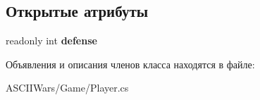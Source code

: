 \subsection*{Открытые атрибуты}
\begin{DoxyCompactItemize}
\item 
\hypertarget{class_a_s_c_i_i_wars_1_1_game_1_1_armor_ac056d4feeb6864656f00144af7a4ed8b}{}\label{class_a_s_c_i_i_wars_1_1_game_1_1_armor_ac056d4feeb6864656f00144af7a4ed8b} 
readonly int {\bfseries defense}
\end{DoxyCompactItemize}


Объявления и описания членов класса находятся в файле\+:\begin{DoxyCompactItemize}
\item 
A\+S\+C\+I\+I\+Wars/\+Game/Player.\+cs\end{DoxyCompactItemize}
